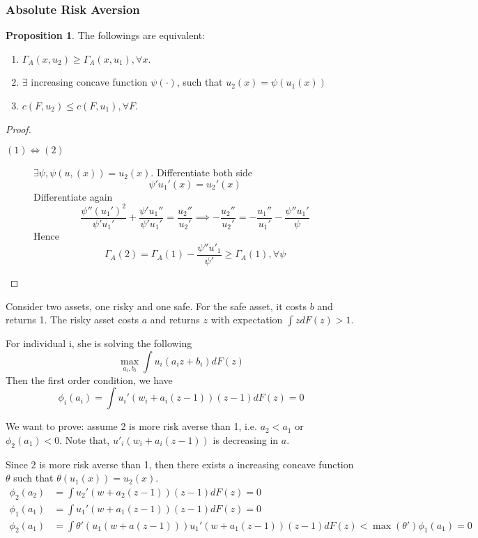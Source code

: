 \documentclass[11pt, a4paper, oneside]{article}
\theoremstyle{definition}
\newtheorem{myprop}{Proposition}
\theoremstyle{proposition}
\theoremstyle{corollary}
\theoremstyle{lemma}
\theoremstyle{theorem}
\begin{document}
\subsubsection{Absolute Risk Aversion}

\begin{myprop}
The followings are equivalent:
\begin{enumerate}[(1)]
\item $\Gamma_A(x, u_2) \geq \Gamma_A(x, u_1), \forall x$. 
\item $\exists$ increasing concave function $\psi(\cdot)$, such that $u_2(x) = \psi(u_1(x))$
\item $c(F, u_2) \leq c(F, u_1), \forall F$. 
\end{enumerate}
\end{myprop}

\begin{proof}
\begin{description}
\item[$(1)\iff(2)$] $\exists \psi, \psi(u, (x)) = u_2(x)$. Differentiate both side 
$$\psi'u_1'(x) = u_2'(x)$$
Differentiate again
$$\frac{\psi''(u_1')^2}{\psi'u_1'}  +\frac{\psi'u_1''}{\psi'u_1'} = \frac{u_2''}{u_2'} \implies -\frac{u_2''}{u_2'} = -\frac{u_1''}{u_1'} - \frac{\psi''u_1'}{\psi}$$
Hence
$$\Gamma_A(2) = \Gamma_A(1) - \frac{\psi''u'_1}{\psi'} \geq  \Gamma_A(1), \forall \psi$$
\end{description}
\end{proof}

Consider two assets, one risky and one safe. For the safe asset, it costs $b$ and returns 1. The risky asset costs $a$ and returns $z$ with expectation $\int zdF(z) > 1$. 

For individual i, she is solving the following
$$\max_{a_i, b_i}\int u_i(a_iz+b_i)dF(z)$$
Then the first order condition, we have $$\phi_i(a_i) = \int u_i'(w_i+a_i(z-1))(z-1)dF(z) = 0$$

We want to prove: assume 2 is more risk averse than 1, i.e. $a_2 < a_1$ or $\phi_2(a_1) < 0$. Note that, $u'_i(w_i+a_i(z-1))$ is decreasing in $a$. 

Since 2 is more risk averse than 1, then there exists a increasing concave function $\theta$ such that $\theta(u_1(x)) = u_2(x)$. 
\begin{align*}
\phi_2(a_2) &= \int u_2'(w+a_2(z-1))(z-1)dF(z) = 0 \\
\phi_1(a_1) &= \int u_1'(w+a_1(z-1))(z-1)dF(z) = 0 \\
\phi_2(a_1) &=\int \theta'(u_1(w+a(z-1)))u_1'(w+a_1(z-1))(z-1)dF(z)  < \max(\theta') \phi_1(a_1) =0\\
\end{align*}
\end{document}
